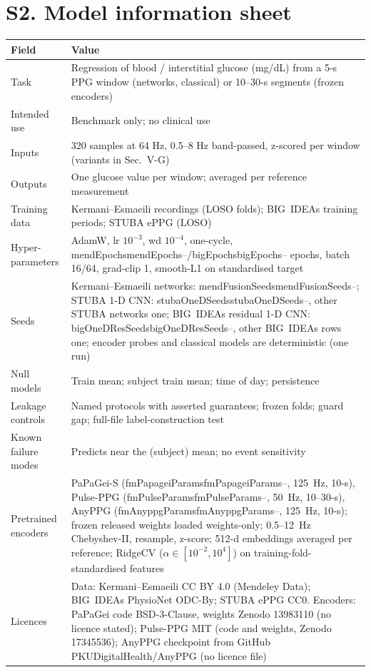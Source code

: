 \documentclass[journal,onecolumn]{IEEEtran}
\newcommand{\m}[1]{\ifcsname #1\endcsname\csname #1\endcsname\else\textcolor{red}{--}\fi}
\begin{document}
\section*{S2. Model information sheet}
\begin{longtable}{@{}p{2.6cm}p{5.5cm}@{}}
\toprule
\textbf{Field} & \textbf{Value} \\
\midrule
Task & Regression of blood / interstitial glucose (mg/dL) from a 5-s PPG window (networks, classical) or 10--30-s segments (frozen encoders) \\
Intended use & Benchmark only; no clinical use \\
Inputs & 320 samples at 64 Hz, 0.5--8 Hz band-passed, z-scored per window (variants in Sec.~V-G) \\
Outputs & One glucose value per window; averaged per reference measurement \\
Training data & Kermani--Esmaeili recordings (LOSO folds); BIG~IDEAs training periods; STUBA ePPG (LOSO) \\
Hyper-parameters & AdamW, lr $10^{-3}$, wd $10^{-4}$, one-cycle, \m{mendEpochs}/\m{bigEpochs} epochs, batch 16/64, grad-clip 1, smooth-L1 on standardised target \\
Seeds & Kermani--Esmaeili networks: \m{mendFusionSeeds}; STUBA 1-D CNN: \m{stubaOneDSeeds}, other STUBA networks one; BIG~IDEAs residual 1-D CNN: \m{bigOneDResSeeds}, other BIG~IDEAs rows one; encoder probes and classical models are deterministic (one run) \\
Null models & Train mean; subject train mean; time of day; persistence \\
Leakage controls & Named protocols with asserted guarantees; frozen folds; guard gap; full-file label-construction test \\
Known failure modes & Predicts near the (subject) mean; no event sensitivity \\
Pretrained encoders & PaPaGei-S (\m{fmPapageiParams}, 125~Hz, 10-s), Pulse-PPG (\m{fmPulseParams}, 50~Hz, 10--30-s), AnyPPG (\m{fmAnyppgParams}, 125~Hz, 10-s); frozen released weights loaded weights-only; 0.5--12~Hz Chebyshev-II, resample, z-score; 512-d embeddings averaged per reference; RidgeCV ($\alpha\in[10^{-2},10^{4}]$) on training-fold-standardised features \\
Licences & Data: Kermani--Esmaeili CC BY 4.0 (Mendeley Data); BIG~IDEAs PhysioNet ODC-By; STUBA ePPG CC0.  Encoders: PaPaGei code BSD-3-Clause, weights Zenodo 13983110 (no licence stated); Pulse-PPG MIT (code and weights, Zenodo 17345536); AnyPPG checkpoint from GitHub PKUDigitalHealth/AnyPPG (no licence file) \\
\bottomrule
\end{longtable}
\end{document}
